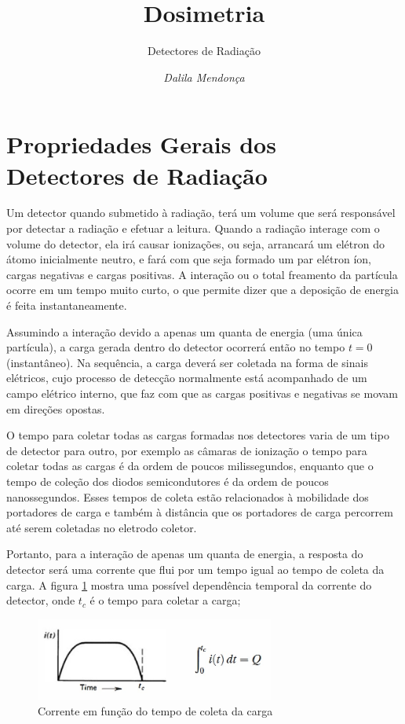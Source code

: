\documentclass[11pt,a4paper]{article}
\title{Dosimetria}
\author{Detectores de Radiação\nocite{*}}
\date{\textit{Dalila Mendonça}}
\newcounter{exemplo}
\begin{document}
	\maketitle

\section{Propriedades Gerais dos Detectores de Radiação}

    Um detector quando submetido à radiação, terá um volume que será responsável por detectar a radiação e efetuar a leitura. Quando a radiação interage com o volume do detector, ela irá causar ionizações, ou seja, arrancará um elétron do átomo inicialmente neutro, e fará com que seja formado um par elétron íon, cargas negativas e cargas positivas. A interação ou o total freamento da partícula ocorre em um tempo muito curto, o que permite dizer que a deposição de energia é feita instantaneamente. 

    Assumindo a interação devido a apenas um quanta de energia (uma única partícula), a carga gerada dentro do detector ocorrerá então no tempo $t = 0$ (instantâneo). Na sequência, a carga deverá ser coletada na forma de sinais elétricos, cujo processo de detecção normalmente está acompanhado de um campo elétrico interno, que faz com que as cargas positivas e negativas se movam em direções opostas. 

    O tempo para coletar todas as cargas formadas nos detectores varia de um tipo de detector para outro, por exemplo as câmaras de ionização o tempo para coletar todas as cargas é da ordem de poucos milissegundos, enquanto que o tempo de coleção dos  diodos semicondutores é da ordem de poucos nanossegundos. Esses tempos de coleta estão relacionados à mobilidade dos portadores de carga e também à distância que os portadores de carga percorrem até serem coletadas no eletrodo coletor.

    Portanto, para a interação de apenas um quanta de energia, a resposta do detector será uma corrente que flui por um tempo igual ao tempo de coleta da carga. A figura \ref{fig:esquemaTempoColetaCorrente} mostra uma possível dependência temporal da corrente do detector, onde $t_c$ é o tempo para coletar a carga;

        \begin{figure}[h]
            \centering
            \includegraphics[width=0.7\textwidth]{Imagens/esquemaTempoColetaCorrente.jpg}
            \caption{Corrente em função do tempo de coleta da carga}
            \label{fig:esquemaTempoColetaCorrente}
        \end{figure}
\end{document}
